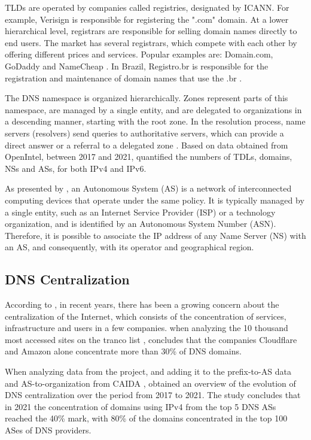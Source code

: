 \documentclass[12pt]{article}
\begin{document}
TLDs are operated by companies called registries, designated by ICANN. For example, Verisign is responsible for registering the ".com" domain. At a lower hierarchical level, registrars are responsible for selling domain names directly to end users. The market has several registrars, which compete with each other by offering different prices and services. Popular examples are: Domain.com, GoDaddy and NameCheap \cite{tanenbaum:21}. In Brazil, Registro.br is responsible for the registration and maintenance of domain names that use the .br \cite{registrobr}.

The DNS namespace is organized hierarchically. Zones represent parts of this namespace, are managed by a single entity, and are delegated to organizations in a descending manner, starting with the root zone. In the resolution process, name servers (resolvers) send queries to authoritative servers, which can provide a direct answer or a referral to a delegated zone \cite{deccio:09}. Based on data obtained from OpenIntel, between 2017 and 2021, \cite{zembruzki:22} quantified the numbers of TDLs, domains, NSs and ASs, for both IPv4 and IPv6.

As presented by \cite{azevedo:24}, an Autonomous System (AS) is a network of interconnected computing devices that operate under the same policy. It is typically managed by a single entity, such as an Internet Service Provider (ISP) or a technology organization, and is identified by an Autonomous System Number (ASN). Therefore, it is possible to associate the IP address of any Name Server (NS) with an AS, and consequently, with its operator and geographical region.

\subsection{DNS Centralization}
According to \cite{moura:20}, in recent years, there has been a growing concern about the centralization of the Internet, which consists of the concentration of services, infrastructure and users in a few companies. \cite{wang:21} when analyzing the 10 thousand most accessed sites on the tranco list \cite{lepochat:19}, concludes that the companies Cloudflare and Amazon alone concentrate more than 30\% of DNS domains.

When analyzing data from the \cite{openintel} project, and adding it to the prefix-to-AS data and AS-to-organization from CAIDA \cite{caida:13} \cite{caida:14}, \cite{zembruzki:22} obtained an overview of the evolution of DNS centralization over the period from 2017 to 2021. The study concludes that in 2021 the concentration of domains using IPv4 from the top 5 DNS ASs reached the 40\% mark, with 80\% of the domains concentrated in the top 100 ASes of DNS providers. 
\end{document}
